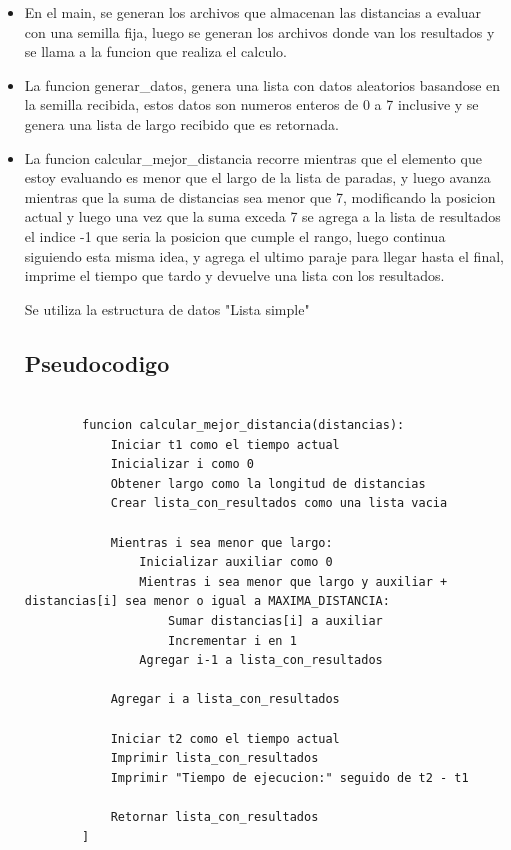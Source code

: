 \documentclass[a4paper, 12pt]{article}
\begin{document}
\begin{itemize}
    \item En el main, se generan los archivos que almacenan las distancias a evaluar con una semilla fija, luego se generan los archivos donde van los resultados y se llama a la funcion que realiza el calculo.
    \item La funcion generar\_datos, genera una lista con datos aleatorios basandose en la semilla recibida, estos datos son numeros enteros de 0 a 7 inclusive y se genera una lista de largo recibido que es retornada.
    \item La funcion calcular\_mejor\_distancia recorre mientras que el elemento que estoy evaluando es menor que el largo de la lista de paradas, y luego avanza mientras que la suma de distancias sea menor que 7, modificando la posicion actual y luego una vez que la suma exceda 7 se agrega a la lista de resultados el indice -1 que seria la posicion que cumple el rango, luego continua siguiendo esta misma idea, y agrega el ultimo paraje para llegar hasta el final, imprime el tiempo que tardo y devuelve una lista con los resultados.

    Se utiliza la estructura de datos "Lista simple"

\subsection{Pseudocodigo}
	\begin{lstlisting}[frame=single]
		 
        funcion calcular_mejor_distancia(distancias):
            Iniciar t1 como el tiempo actual
            Inicializar i como 0
            Obtener largo como la longitud de distancias
            Crear lista_con_resultados como una lista vacia
        
            Mientras i sea menor que largo:
                Inicializar auxiliar como 0
                Mientras i sea menor que largo y auxiliar + distancias[i] sea menor o igual a MAXIMA_DISTANCIA:
                    Sumar distancias[i] a auxiliar
                    Incrementar i en 1
                Agregar i-1 a lista_con_resultados
        
            Agregar i a lista_con_resultados
        
            Iniciar t2 como el tiempo actual
            Imprimir lista_con_resultados
            Imprimir "Tiempo de ejecucion:" seguido de t2 - t1
        
            Retornar lista_con_resultados
        ]
	\end{lstlisting}
    
    
\end{itemize}
\end{document}
